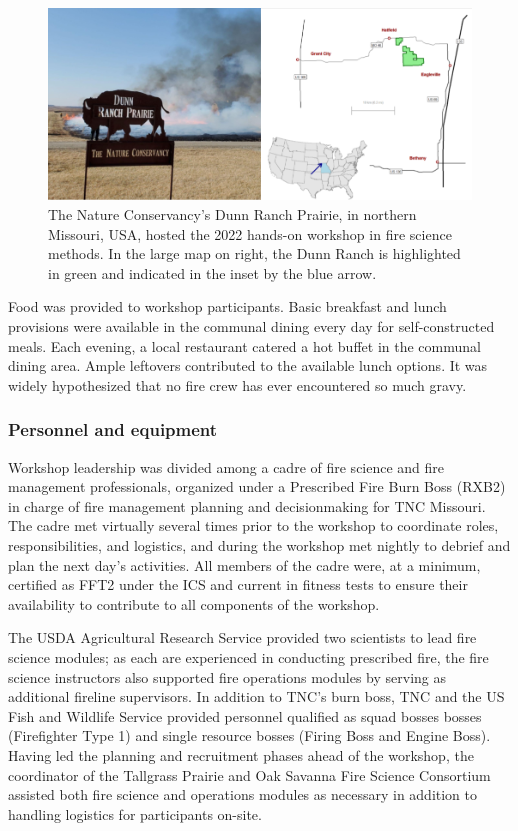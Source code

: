 \documentclass[fire,article,submit,moreauthors,pdftex]{Definitions/mdpi}
\begin{document}
\begin{figure}
\centering
\includegraphics[width=1\columnwidth]{DunnRanchMap.png}
\caption{The Nature Conservancy's Dunn Ranch Prairie, in northern Missouri, USA, hosted the 2022 hands-on workshop in fire science methods. In the large map on right, the Dunn Ranch is highlighted in green and indicated in the inset by the blue arrow.}
\label{DunnRanch}
\end{figure}

Food was provided to workshop participants.
Basic breakfast and lunch provisions were available in the communal dining every day for self-constructed meals.
Each evening, a local restaurant catered a hot buffet in the communal dining area.
Ample leftovers contributed to the available lunch options.
It was widely hypothesized that no fire crew has ever encountered so much gravy.

\subsubsection{Personnel and equipment}

Workshop leadership was divided among a cadre of fire science and fire management professionals, organized under a Prescribed Fire Burn Boss (RXB2) in charge of fire management planning and decisionmaking for TNC Missouri.
The cadre met virtually several times prior to the workshop to coordinate roles, responsibilities, and logistics, and during the workshop met nightly to debrief and plan the next day's activities.
All members of the cadre were, at a minimum, certified as FFT2 under the ICS and current in fitness tests to ensure their availability to contribute to all components of the workshop.

The USDA Agricultural Research Service provided two scientists to lead fire science modules; as each are experienced in conducting prescribed fire, the fire science instructors also supported fire operations modules by serving as additional fireline supervisors.
In addition to TNC's burn boss, TNC and the US Fish and Wildlife Service provided personnel qualified as squad bosses bosses (Firefighter Type 1) and single resource bosses (Firing Boss and Engine Boss).
Having led the planning and recruitment phases ahead of the workshop, the coordinator of the Tallgrass Prairie and Oak Savanna Fire Science Consortium assisted both fire science and operations modules as necessary in addition to handling logistics for participants on-site.
\end{document}
